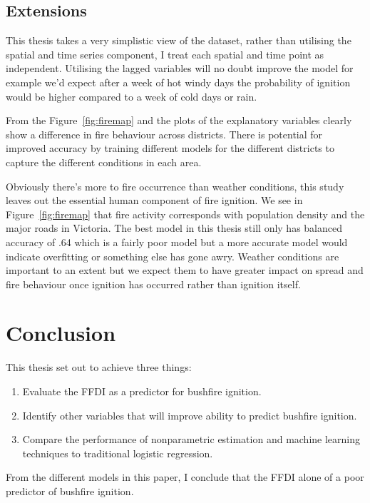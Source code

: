 \documentclass[11pt,a4paper]{article}
\begin{document}
\subsection{Extensions}

This thesis takes a very simplistic view of the dataset, rather than utilising the spatial and time series component, I treat each spatial and time point as independent. Utilising the lagged variables will no doubt improve the model for example we'd expect after a week of hot windy days the probability of ignition would be higher compared to a week of cold days or rain.

From the Figure~\ref{fig:firemap} and the plots of the explanatory variables clearly show a difference in fire behaviour across districts. There is potential for improved accuracy by training different models for the different districts to capture the different conditions in each area.

Obviously there's more to fire occurrence than weather conditions, this study leaves out the essential human component of fire ignition. We see in Figure~\ref{fig:firemap} that fire activity corresponds with population density and the major roads in Victoria. The best model in this thesis still only has balanced accuracy of .64 which is a fairly poor model but a more accurate model would indicate overfitting or something else has gone awry.  Weather conditions are important to an extent but we expect them to have greater impact on spread and fire behaviour once ignition has occurred rather than ignition itself.


\section{Conclusion}

This thesis set out to achieve three things:
\begin{enumerate}
  \item Evaluate the FFDI as a predictor for bushfire ignition.
  \item Identify other variables that will improve ability to predict bushfire ignition.
  \item Compare the performance of nonparametric estimation and machine learning techniques to traditional logistic regression.
\end{enumerate}

From the different models in this paper, I conclude that the FFDI alone of a poor predictor of bushfire ignition.
\end{document}
